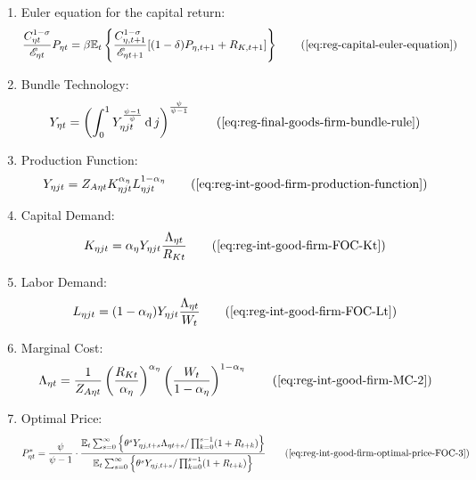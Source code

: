 \documentclass[
thesis.tex
]{subfiles}
\begin{document}
{\begin{itemize}
\begin{enumerate}
		\item Euler equation for the capital return:
		\begin{align}
			\frac{ C_{\eta t}^{1-\sigma} }{ \te } P_{\eta t} &= \beta \mathbb{E}_t \left\{ \frac{ C_{\eta, t+1}^{1-\sigma} }{ \te[t+1] } [(1-\delta) P_{\eta, t+1} + R_{K,t+1}] \right\} \tag{\ref{eq:reg-capital-euler-equation}}
		\end{align}
					
		\item Bundle Technology:
		\begin{align}
			Y_{\eta t} = \left( \int_{0}^{1} Y_{\eta jt}^{\frac{\psi-1}{\psi}} \dif j \right)^{\frac{\psi}{\psi-1}} \tag{\ref{eq:reg-final-goods-firm-bundle-rule}}
		\end{align}
			
		\item Production Function:
		\begin{align}
			Y_{\eta jt} = Z_{A\eta t} K_{\eta jt}^{\alpha_\eta} L_{\eta jt}^{1-{\alpha_\eta}} \tag{\ref{eq:reg-int-good-firm-production-function}}
		\end{align}

		\item Capital Demand:
		\begin{align}
			K_{\eta jt} = {\alpha_\eta} Y_{\eta jt} \frac{\Lambda_{\eta t}}{R_{Kt}} \tag{\ref{eq:reg-int-good-firm-FOC-Kt}}
		\end{align}

		\item Labor Demand:
		\begin{align}
			L_{\eta jt} = (1-{\alpha_\eta}) Y_{\eta jt} \frac{\Lambda_{\eta t}}{W_t} \tag{\ref{eq:reg-int-good-firm-FOC-Lt}}
		\end{align}

		\item Marginal Cost:
		\begin{align}
			\Lambda_{\eta t} = \frac{1}{Z_{A\eta t}} \left( \frac{R_{Kt}}{{\alpha_\eta}} \right)^{{\alpha_\eta}} \left( \frac{W_t}{1-{\alpha_\eta}} \right)^{1-{\alpha_\eta}} \tag{\ref{eq:reg-int-good-firm-MC-2}}
		\end{align}
			
		\item Optimal Price:
		\begin{align}
			P_{\eta t}^\ast = \frac{\psi}{\psi-1} \cdot \frac{ \E \sum_{s=0}^{\infty} \left\{ \theta^s Y_{\eta j,t+s} \Lambda_{\eta t+s} / \prod_{k=0}^{s-1}(1+R_{t+k}) \right\} } {\E \sum_{s=0}^{\infty} \left\{ \theta^s Y_{\eta j,t+s} / \prod_{k=0}^{s-1}(1 + R_{t+k}) \right\}} \tag{\ref{eq:reg-int-good-firm-optimal-price-FOC-3}}
		\end{align}
			

\end{enumerate}
\end{itemize}}
\end{document}

